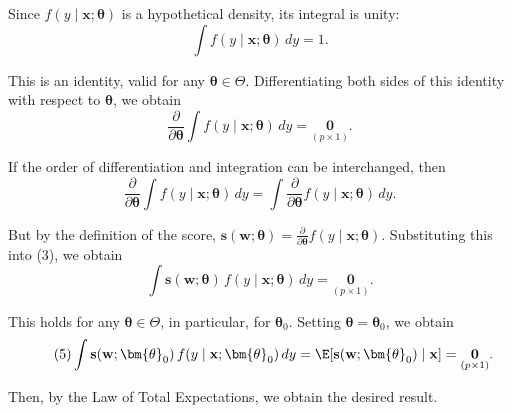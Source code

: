 \begin{answers}

 Since $f(y \mid \mathbf{x}; \bm{\theta})$ is a hypothetical density, its integral is unity:
\begin{equation}
\tag{1}
\int f(y \mid \mathbf{x}; \bm{\theta})\,dy = 1.
\end{equation}

This is an identity, valid for any $\bm{\theta} \in \Theta$. Differentiating both sides of this identity with respect to $\bm{\theta}$, we obtain
\begin{equation}
\tag{2}
\frac{\partial}{\partial\bm{\theta}}\int f(y \mid \mathbf{x}; \bm{\theta})\,dy = \underset{(p \times 1)}{\mathbf{0}}.
\end{equation}

If the order of differentiation and integration can be interchanged, then
\begin{equation}
\tag{3}
\frac{\partial}{\partial\bm{\theta}}\int f(y \mid \mathbf{x}; \bm{\theta})\,dy = \int \frac{\partial}{\partial\bm{\theta}}f(y \mid \mathbf{x}; \bm{\theta})\,dy.
\end{equation}

But by the definition of the score, $\mathbf{s}(\mathbf{w}; \bm{\theta}) = \frac{\partial}{\partial\bm{\theta}}f(y \mid \mathbf{x}; \bm{\theta})$. Substituting this into (3), we obtain
\begin{equation}
\tag{4}
\int \mathbf{s}(\mathbf{w}; \bm{\theta})\,f(y \mid \mathbf{x}; \bm{\theta})\,dy = \underset{(p \times 1)}{\mathbf{0}}.
\end{equation}

This holds for any $\bm{\theta} \in \Theta$, in particular, for $\bm{\theta}_0$. Setting $\bm{\theta} = \bm{\theta}_0$, we obtain
\begin{equation}
\tag{5}
\int \mathbf{s}(\mathbf{w}; \bm{\theta}_0)\,f(y \mid \mathbf{x}; \bm{\theta}_0)\,dy = \E[\mathbf{s}(\mathbf{w}; \bm{\theta}_0) \mid \mathbf{x}] = \underset{(p \times 1)}{\mathbf{0}}.
\end{equation}

Then, by the Law of Total Expectations, we obtain the desired result.

\end{answers}
